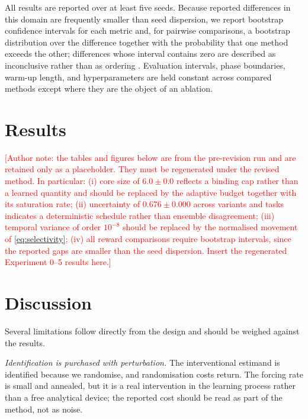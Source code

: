 \documentclass[conference]{IEEEtran}
\begin{document}
All results are reported over at least five seeds. Because reported differences in this domain are frequently smaller than seed dispersion, we report bootstrap confidence intervals for each metric and, for pairwise comparisons, a bootstrap distribution over the difference together with the probability that one method exceeds the other; differences whose interval contains zero are described as inconclusive rather than as ordering \cite{agarwal2021precipice}. Evaluation intervals, phase boundaries, warm-up length, and hyperparameters are held constant across compared methods except where they are the object of an ablation.

\section{Results}

\textcolor{red}{[Author note: the tables and figures below are from the pre-revision run and are retained only as a placeholder. They must be regenerated under the revised method. In particular: (i) core size of $6.0\pm0.0$ reflects a binding cap rather than a learned quantity and should be replaced by the adaptive budget together with its saturation rate; (ii) uncertainty of $0.676\pm0.000$ across variants and tasks indicates a deterministic schedule rather than ensemble disagreement; (iii) temporal variance of order $10^{-8}$ should be replaced by the normalised movement of \eqref{eq:selectivity}; (iv) all reward comparisons require bootstrap intervals, since the reported gaps are smaller than the seed dispersion. Insert the regenerated Experiment 0--5 results here.]}

\section{Discussion}

Several limitations follow directly from the design and should be weighed against the results.

\emph{Identification is purchased with perturbation.} The interventional estimand is identified because we randomise, and randomisation costs return. The forcing rate is small and annealed, but it is a real intervention in the learning process rather than a free analytical device; the reported cost should be read as part of the method, not as noise.
\end{document}
